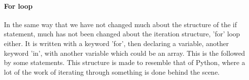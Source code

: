 


\paragraph*{For loop}
In the same way that we have not changed much about the structure of the if statement, much has not been changed about the iteration structure, 'for' loop either. It is written with a keyword 'for', then declaring a variable, another keyword 'in', with another variable which could be an array. This is the followed by some statements.
This structure is made to resemble that of Python, where a lot of the work of iterating through something is done behind the scene.

